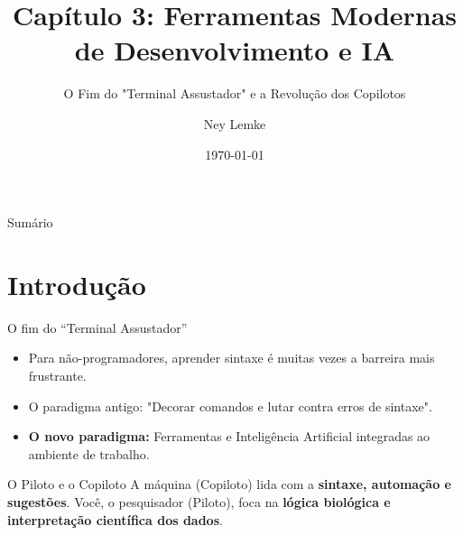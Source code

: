 


\title[Cap. 3: IDEs e IA]{Capítulo 3: Ferramentas Modernas de Desenvolvimento e IA}
\subtitle{O Fim do "Terminal Assustador" e a Revolução dos Copilotos}
\author{Ney Lemke}
\date{\today}



\begin{frame}
\titlepage
\end{frame}

\begin{frame}{Sumário}
\tableofcontents
\end{frame}

\section{Introdução}

\begin{frame}{O fim do ``Terminal Assustador''}
\begin{itemize}
    \item Para não-programadores, aprender sintaxe é muitas vezes a barreira mais frustrante.
    \item O paradigma antigo: "Decorar comandos e lutar contra erros de sintaxe".
    \item \textbf{O novo paradigma:} Ferramentas e Inteligência Artificial integradas ao ambiente de trabalho.
\end{itemize}

\vspace{0.5cm}
\begin{block}{O Piloto e o Copiloto}
A máquina (Copiloto) lida com a \textbf{sintaxe, automação e sugestões}. Você, o pesquisador (Piloto), foca na \textbf{lógica biológica e interpretação científica dos dados}.
\end{block}
\end{frame}

